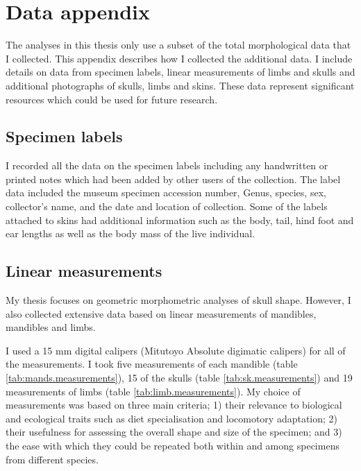 

\chapter{Data appendix}
\label{appendix}

	The analyses in this thesis only use a subset of the total morphological data that I collected. This appendix describes how I collected the additional data. I include details on data from specimen labels, linear measurements of limbs and skulls and additional photographs of skulls, limbs and skins. These data represent significant resources which could be used for future research.

\section{Specimen labels}

	I recorded all the data on the specimen labels including any handwritten or printed notes which had been added by other users of the collection. The label data included the museum specimen accession number, Genus, species, sex, collector's name, and the date and location of collection. Some of the labels attached to skins had additional information such as the body, tail, hind foot and ear lengths as well as the body mass of the live individual. 
\section{Linear measurements}
\label{sect:measurements}

	My thesis focuses on geometric morphometric analyses of skull shape. However, I also collected extensive data based on linear measurements of mandibles, mandibles and limbs. 
	
	I used a 15 mm digital calipers (Mitutoyo Absolute digimatic calipers) for all of the measurements. I took five measurements of each mandible (table \ref{tab:mands.measurements}), 15 of the skulls (table \ref{tab:sk.measurements}) and 19 measurements of limbs (table \ref{tab:limb.measurements}). My choice of  measurements was based on three main criteria; 1) their relevance to biological and ecological traits such as diet specialisation and locomotory adaptation; 2) their usefulness for assessing the overall shape and size of the specimen; and 3) the ease with which they could be repeated both within and among specimens from different species. 

